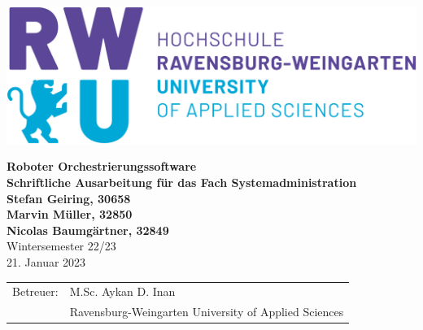 \pagestyle{empty}



\begin{center}


\vspace*{2cm}
\includegraphics[scale=0.15]{imgs/rwu_logo.png}
\vspace*{3cm}

\huge
\textbf{Roboter Orchestrierungssoftware}\\
\Large
\vspace*{2cm}
\noindent \textbf{Schriftliche Ausarbeitung für das Fach Systemadministration}\\
\vspace*{0.5cm}
\noindent \textbf{Stefan Geiring, 30658}\\
\noindent \textbf{Marvin Müller, 32850}\\
\noindent \textbf{Nicolas Baumgärtner, 32849}\\
\vspace*{0.5cm}
Wintersemester 22/23\\
\normalsize 
21. Januar 2023
\vspace*{2cm}
\end{center}


\vspace*{4.5cm}
\begin{tabular}{ll}
Betreuer: & M.Sc. Aykan D. Inan \\
 & Ravensburg-Weingarten University of Applied Sciences\\
\end{tabular}

